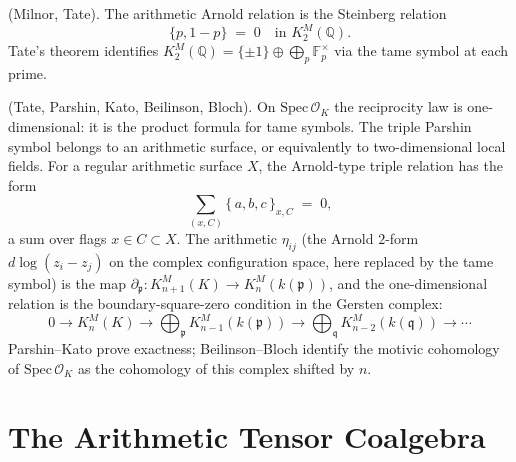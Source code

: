 \begin{theorem}
\label{v4-arith:thm:steinberg-replaces-arnold}
\ClaimStatusProvedElsewhere (Milnor, Tate). The arithmetic Arnold
relation is the Steinberg relation
\begin{equation}
\boxed{\;\{p,1-p\}\;=\;0\quad\text{in }K_{2}^{M}(\mathbb{Q}).\;}
\end{equation}
Tate's theorem identifies
\(K_{2}^{M}(\mathbb{Q})=\{\pm 1\}\oplus\bigoplus_{p}\mathbb{F}_{p}^{\times}\)
via the tame symbol at each prime.
\end{theorem}

\begin{theorem}
\label{v4-arith:thm:parshin-reciprocity}
\ClaimStatusProvedElsewhere (Tate, Parshin, Kato, Beilinson, Bloch).
On \(\mathrm{Spec}\,\mathcal{O}_{K}\) the reciprocity law is
one-dimensional: it is the product formula for tame symbols. The
triple Parshin symbol belongs to an arithmetic surface, or
equivalently to two-dimensional local fields. For a regular
arithmetic surface \(X\), the Arnold-type triple relation has the form
\begin{equation}
\sum_{(x,C)}\{\,a,b,c\,\}_{x,C}\;=\;0,
\end{equation}
a sum over flags \(x\in C\subset X\). The arithmetic \(\eta_{ij}\) (the Arnold \(2\)-form
\(d\log(z_i - z_j)\) on the complex configuration space, here
replaced by the tame symbol) is the map
\(\partial_{\mathfrak{p}}\colon K_{n+1}^{M}(K)\to K_{n}^{M}(k(\mathfrak{p}))\),
and the one-dimensional relation is the boundary-square-zero condition
in the Gersten complex:
\begin{equation}
0\to K_{n}^{M}(K)\to\bigoplus_{\mathfrak{p}}K_{n-1}^{M}(k(\mathfrak{p}))\to\bigoplus_{\mathfrak{q}}K_{n-2}^{M}(k(\mathfrak{q}))\to\cdots
\end{equation}
Parshin--Kato prove exactness; Beilinson--Bloch identify the
motivic cohomology of \(\mathrm{Spec}\,\mathcal{O}_{K}\) as the
cohomology of this complex shifted by \(n\).
\end{theorem}

\section{The Arithmetic Tensor Coalgebra}
\label{v4-arith:bar:tensor-coalgebra}

